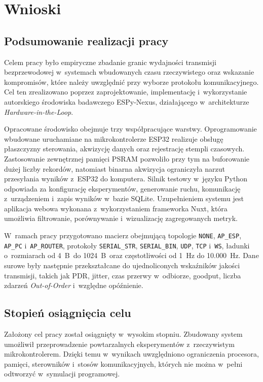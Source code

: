 \chapter{Wnioski}
\label{chap:wnioski}

\section{Podsumowanie realizacji pracy}

Celem pracy było empiryczne zbadanie granic wydajności transmisji bezprzewodowej w~systemach wbudowanych czasu rzeczywistego oraz wskazanie kompromisów, które należy uwzględnić przy wyborze protokołu komunikacyjnego.
Cel ten zrealizowano poprzez zaprojektowanie, implementację i~wykorzystanie autorskiego środowiska badawczego ESPy-Nexus, działającego w~architekturze \textit{Hardware-in-the-Loop}.

Opracowane środowisko obejmuje trzy współpracujące warstwy.
Oprogramowanie wbudowane uruchamiane na mikrokontrolerze ESP32 realizuje obsługę płaszczyzny sterowania, akwizycję danych oraz rejestrację stempli czasowych.
Zastosowanie zewnętrznej pamięci PSRAM pozwoliło przy tym na buforowanie dużej liczby rekordów, natomiast binarna akwizycja ograniczyła narzut przesyłania wyników z~ESP32 do komputera.
Silnik testowy w~języku Python odpowiada za konfigurację eksperymentów, generowanie ruchu, komunikację z~urządzeniem i~zapis wyników w~bazie SQLite.
Uzupełnieniem systemu jest aplikacja webowa wykonana z~wykorzystaniem frameworka Nuxt, która umożliwia filtrowanie, porównywanie i~wizualizację zagregowanych metryk.

W~ramach pracy przygotowano macierz obejmującą topologie \texttt{NONE}, \texttt{AP\_ESP}, \texttt{AP\_PC} i~\texttt{AP\_ROUTER}, protokoły \texttt{SERIAL\_STR}, \texttt{SERIAL\_BIN}, \texttt{UDP}, \texttt{TCP} i~\texttt{WS}, ładunki o~rozmiarach od 4~B~do 1024~B~oraz częstotliwości od 1~Hz do 10.000~Hz.
Dane surowe były następnie przekształcane do ujednoliconych wskaźników jakości transmisji, takich jak PDR, jitter, czas przerwy w~odbiorze, goodput, liczba zdarzeń \textit{Out-of-Order} i~względne opóźnienie.

\section{Stopień osiągnięcia celu}

Założony cel pracy został osiągnięty w~wysokim stopniu.
Zbudowany system umożliwił przeprowadzenie powtarzalnych eksperymentów z~rzeczywistym mikrokontrolerem.
Dzięki temu w~wynikach uwzględniono ograniczenia procesora, pamięci, sterowników i~stosów komunikacyjnych, których nie można w~pełni odtworzyć w~symulacji programowej.

